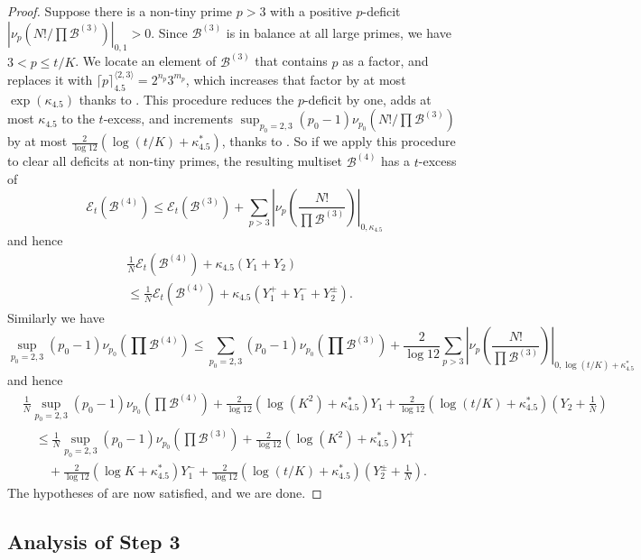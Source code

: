 \documentclass[12pt,a4paper,reqno]{amsart}
\numberwithin{equation}{section}
\theoremstyle{plain}
\theoremstyle{definition}
\newcommand\tuple{{\mathcal B}}
\newcommand\excess{{\mathcal{E}}}
\begin{document}
\begin{proof} Suppose there is a non-tiny prime $p>3$ with a positive $p$-deficit
$|\nu_p(N!/\prod \tuple^{(3)})|_{0,1} > 0$.  Since $\tuple^{(3)}$ is in balance at all large primes, we have $3 < p \leq t/K$.  We locate an element of $\tuple^{(3)}$ that contains $p$ as a factor, and replaces it with $\lceil p \rceil^{\langle 2,3 \rangle}_{4.5} = 2^{n_p} 3^{m_p}$, which increases that factor by at most $\exp(\kappa_{4.5})$ thanks to .  This procedure reduces the $p$-deficit by one, adds at most $\kappa_{4.5}$ to the $t$-excess, and increments $\sup_{p_0=2,3} (p_0-1)\nu_{p_0}(N!/\prod \tuple^{(3)})$ by  at most $\frac{2}{\log 12}(\log(t/K) + \kappa^*_{4.5})$, thanks to .
So if we apply this procedure to clear all deficits at non-tiny primes, the resulting multiset $\tuple^{(4)}$ has a $t$-excess of
$$ \excess_t(\tuple^{(4)}) \leq \excess_t(\tuple^{(3)})  + \sum_{p > 3} \left|\nu_p\left(\frac{N!}{\prod \tuple^{(3)}}\right)\right|_{0,\kappa_{4.5}}$$
and hence
\begin{align*}
  &\frac{1}{N} \excess_t(\tuple^{(4)}) + \kappa_{4.5} (Y_1 + Y_2) \\
&\leq \frac{1}{N} \excess_t(\tuple^{(4)}) +
\kappa_{4.5} (Y^+_1 + Y^-_1 + Y_2^\pm).
\end{align*}
Similarly we have
$$\sup_{p_0=2,3} (p_0-1) \nu_{p_0}\left(\prod \tuple^{(4)}\right)  \leq
\sum_{p_0=2,3} (p_0-1) \nu_{p_0}\left(\prod \tuple^{(3)}\right) + \frac{2}{\log 12} \sum_{p>3} \left|\nu_p\left(\frac{N!}{\prod \tuple^{(3)}}\right)\right|_{0, \log(t/K)+\kappa^*_{4.5}}$$
and hence
\begin{align*}
  &\frac{1}{N} \sup_{p_0=2,3} (p_0-1) \nu_{p_0}\left(\prod \tuple^{(4)}\right) + \frac{2}{\log 12} (\log(K^2)+\kappa^*_{4.5}) Y_1 + \frac{2}{\log 12} (\log(t/K)+\kappa^*_{4.5}) (Y_2+\frac{1}{N}) \\
  &\quad \leq 
  \frac{1}{N} \sup_{p_0=2,3} (p_0-1) \nu_{p_0}\left(\prod \tuple^{(3)}\right)+ \frac{2}{\log 12}  (\log(K^2)+\kappa^*_{4.5}) Y^+_1 \\
  &\quad \quad + \frac{2}{\log 12} (\log K + \kappa^*_{4.5}) Y^-_1 + \frac{2}{\log 12} (\log(t/K)+\kappa^*_{4.5}) (Y^\pm_2+\frac{1}{N}).
\end{align*}
The hypotheses of  are now satisfied, and we are done.
\end{proof}

\subsection{Analysis of Step 3}
\end{document}
